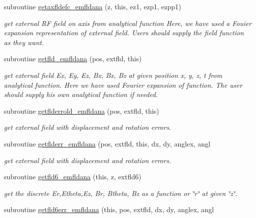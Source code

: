\begin{DoxyCompactItemize}
subroutine \mbox{\hyperlink{namespaceemfldanaclass_a458770ca16d15a091232d5067c282f5a}{getaxfldefc\+\_\+emfldana}} (z, this, ez1, ezp1, ezpp1)
\begin{DoxyCompactList}\small\item\em get external RF field on axis from analytical function Here, we have used a Fouier expansion representation of external field. Users should supply the field function as they want. \end{DoxyCompactList}\item 
subroutine \mbox{\hyperlink{namespaceemfldanaclass_abf2e2171f7b0a3aa36462d1965e428f4}{getfld\+\_\+emfldana}} (pos, extfld, this)
\begin{DoxyCompactList}\small\item\em get external field Ex, Ey, Ez, Bx, Bx, Bz at given position x, y, z, t from analytical function. Here we have used Fourier expansion of function. The user should supply his own analytical function if needed. \end{DoxyCompactList}\item 
subroutine \mbox{\hyperlink{namespaceemfldanaclass_a653a95a05e7093fca664a1a8ba38e991}{getflderrold\+\_\+emfldana}} (pos, extfld, this)
\begin{DoxyCompactList}\small\item\em get external field with displacement and rotation errors. \end{DoxyCompactList}\item 
subroutine \mbox{\hyperlink{namespaceemfldanaclass_a95772a7b3030b57d7c0753ef96a2f764}{getflderr\+\_\+emfldana}} (pos, extfld, this, dx, dy, anglex, angl
\begin{DoxyCompactList}\small\item\em get external field with displacement and rotation errors. \end{DoxyCompactList}\item 
subroutine \mbox{\hyperlink{namespaceemfldanaclass_a3ff336abdafaac7ad874da092e6365ed}{getfld6\+\_\+emfldana}} (this, z, extfld6)
\begin{DoxyCompactList}\small\item\em get the discrete Er,Etheta,Ez, Br, Btheta, Bz as a function or \char`\"{}r\char`\"{} at given \char`\"{}z\char`\"{}. \end{DoxyCompactList}\item 
subroutine \mbox{\hyperlink{namespaceemfldanaclass_af8390aa825a9ca8733745551ee96bc17}{getfld6err\+\_\+emfldana}} (this, pos, extfld, dx, dy, anglex, angl
\item 

\end{DoxyCompactItemize}
